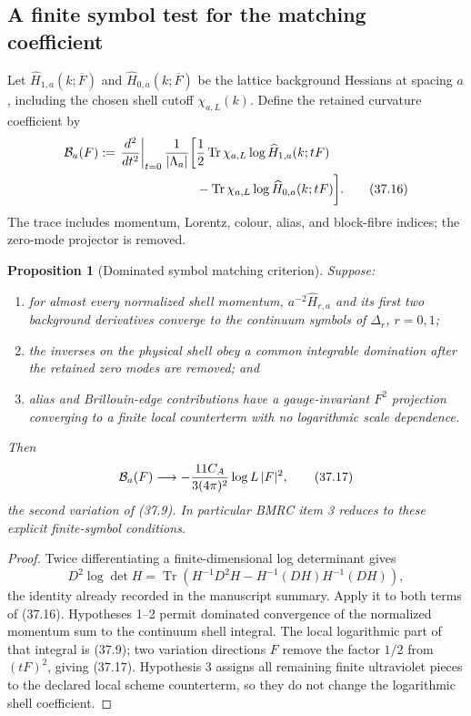 \documentclass[11pt,oneside]{book}
\newtheorem{proposition}[theorem]{Proposition}
\theoremstyle{definition}
\theoremstyle{remark}
\begin{document}
\subsection{A finite symbol test for the matching coefficient}

Let \(\widehat H_{1,a}(k;\overline F)\) and
\(\widehat H_{0,a}(k;\overline F)\) be the lattice background
Hessians at spacing \(a\), including the chosen shell cutoff
\(\chi_{a,L}(k)\).  Define the retained curvature coefficient by
\[
\begin{split}
 {\cal B}_a(F):=
 \left.\frac{d^2}{dt^2}\right|_{t=0}
 \frac1{|\Lambda_a|}
 \bigg[
 &\frac12\operatorname{Tr}
 \chi_{a,L}\log\widehat H_{1,a}(k;tF)\\
 &-\operatorname{Tr}
 \chi_{a,L}\log\widehat H_{0,a}(k;tF)
 \bigg].                                                        \tag{37.16}
\end{split}
\]
The trace includes momentum, Lorentz, colour, alias, and block-fibre
indices; the zero-mode projector is removed.

\begin{proposition}[Dominated symbol matching criterion]
\label{prop:e8v37-symbol-test}
Suppose:
\begin{enumerate}
\item for almost every normalized shell momentum,
      \(a^{-2}\widehat H_{r,a}\) and its first two background
      derivatives converge to the continuum symbols of
      \(\Delta_r\), \(r=0,1\);
\item the inverses on the physical shell obey a common integrable
      domination after the retained zero modes are removed; and
\item alias and Brillouin-edge contributions have a gauge-invariant
      \(F^2\) projection converging to a finite local counterterm
      with no logarithmic scale dependence.
\end{enumerate}
Then
\[
 {\cal B}_a(F)\longrightarrow
 -\frac{11C_A}{3(4\pi)^2}\log L\,|F|^2,                         \tag{37.17}
\]
the second variation of (37.9).  In particular BMRC item 3 reduces
to these explicit finite-symbol conditions.
\end{proposition}

\begin{proof}
Twice differentiating a finite-dimensional log determinant gives
\[
 D^2\log\det H
 =
 \operatorname{Tr}\left(
 H^{-1}D^2H-H^{-1}(DH)H^{-1}(DH)
 \right),                                                       \tag{37.18}
\]
the identity already recorded in the manuscript summary.  Apply it
to both terms of (37.16).  Hypotheses 1--2 permit dominated
convergence of the normalized momentum sum to the continuum shell
integral.  The local logarithmic part of that integral is (37.9);
two variation directions \(F\) remove the factor \(1/2\) from
\((tF)^2\), giving (37.17).  Hypothesis 3 assigns all remaining
finite ultraviolet pieces to the declared local scheme
counterterm, so they do not change the logarithmic shell
coefficient.
\end{proof}
\end{document}
